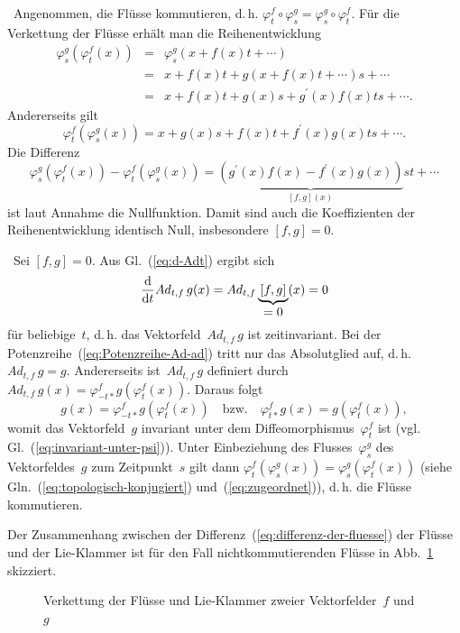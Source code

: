 \begin{svmultproof2}
\hinreichend\ Angenommen, die Flüsse kommutieren, d.\,h. $\varphi_{t}^{f}\circ\varphi_{s}^{g}=\varphi_{s}^{g}\circ\varphi_{t}^{f}$.
Für die Verkettung der Flüsse erhält man die Reihenentwicklung
\[
\begin{array}{ccl}
\varphi_{s}^{g}(\varphi_{t}^{f}(x)) & = & \varphi_{s}^{g}(x+f(x)t+\cdots)\\
 & = & x+f(x)t+g(x+f(x)t+\cdots)s+\cdots\\
 & = & x+f(x)t+g(x)s+g^{\prime}(x)f(x)ts+\cdots.
\end{array}
\]
Andererseits gilt 
\[
\varphi_{t}^{f}(\varphi_{s}^{g}(x))=x+g(x)s+f(x)t+f^{\prime}(x)g(x)ts+\cdots.
\]
Die Differenz 
\begin{equation}
\varphi_{s}^{g}(\varphi_{t}^{f}(x))-\varphi_{t}^{f}(\varphi_{s}^{g}(x))=\underbrace{\left(g^{\prime}(x)f(x)-f^{\prime}(x)g(x)\right)}_{{\displaystyle [f,g](x)}}st+\cdots\label{eq:differenz-der-fluesse}
\end{equation}
ist laut Annahme die Nullfunktion. Damit sind auch die Koeffizienten
der Reihenentwicklung identisch Null, insbesondere $[f,g]=0$.

\notwendig\ Sei $[f,g]=0$. Aus Gl.~(\ref{eq:d-Adt}) ergibt sich
\[
\frac{{\mathrm{d}}}{{\mathrm{d}} t}Ad_{t,f}\,g(x)=Ad_{t,f}\underbrace{\,[f,g]\,}_{{\displaystyle =0}}(x)=0
\]
für beliebige~$t$, d.\,h. das Vektorfeld~$Ad_{t,f}\,g$ ist zeitinvariant.
Bei der Potenzreihe~(\ref{eq:Potenzreihe-Ad-ad}) tritt nur das Absolutglied
auf, d.\,h. $Ad_{t,f}\,g=g$. Andererseits ist~$Ad_{t,f}\,g$ definiert
durch $Ad_{t,f}\,g(x)=\varphi_{-t*}^{f}g(\varphi_{t}^{f}(x))$. Daraus
folgt 
\[
g(x)=\varphi_{-t*}^{f}g(\varphi_{t}^{f}(x))\quad\mbox{bzw.}\quad\varphi_{t*}^{f}g(x)=g(\varphi_{t}^{f}(x)),
\]
womit das Vektorfeld~$g$ invariant unter dem Diffeomorphismus~$\varphi_{t}^{f}$
ist (vgl. Gl.~(\ref{eq:invariant-unter-psi})). Unter Einbeziehung
des Flusses~$\varphi_{s}^{g}$ des Vektorfeldes~$g$ zum Zeitpunkt~$s$
gilt dann $\varphi_{t}^{f}(\varphi_{s}^{g}(x))=\varphi_{s}^{g}(\varphi_{t}^{f}(x))$
(siehe Gln.~(\ref{eq:topologisch-konjugiert}) und~(\ref{eq:zugeordnet})),
d.\,h. die Flüsse kommutieren.
\end{svmultproof2}

Der Zusammenhang zwischen der Differenz~(\ref{eq:differenz-der-fluesse})
der Flüsse und der Lie-Klammer ist für den Fall nichtkommutierenden
Flüsse in Abb.~\ref{fig:nichtkommutierende-fluesse} skizziert.

\begin{figure}
\begin{centering}
\resizebox{0.8\textwidth}{!}{}
\par\end{centering}
\caption{Verkettung der Flüsse und Lie-Klammer zweier Vektorfelder~$f$ und~$g$\label{fig:nichtkommutierende-fluesse}}
\end{figure}

